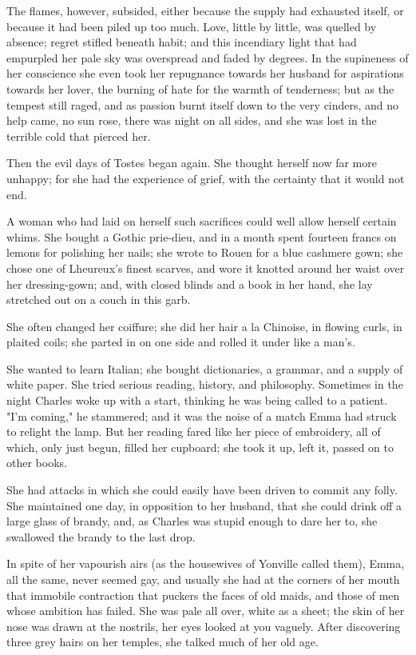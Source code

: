 \documentclass[11pt,twocolumn]{ltugboat}
\begin{document}
The flames, however, subsided, either because the supply had exhausted
itself, or because it had been piled up too much. Love, little by
little, was quelled by absence; regret stifled beneath habit; and this
incendiary light that had empurpled her pale sky was overspread and
faded by degrees. In the supineness of her conscience she even took her
repugnance towards her husband for aspirations towards her lover, the
burning of hate for the warmth of tenderness; but as the tempest still
raged, and as passion burnt itself down to the very cinders, and no help
came, no sun rose, there was night on all sides, and she was lost in the
terrible cold that pierced her.

Then the evil days of Tostes began again. She thought herself now far
more unhappy; for she had the experience of grief, with the certainty
that it would not end.

A woman who had laid on herself such sacrifices could well allow herself
certain whims. She bought a Gothic prie-dieu, and in a month spent
fourteen francs on lemons for polishing her nails; she wrote to Rouen
for a blue cashmere gown; she chose one of Lheureux's finest scarves,
and wore it knotted around her waist over her dressing-gown; and, with
closed blinds and a book in her hand, she lay stretched out on a couch
in this garb.

She often changed her coiffure; she did her hair a la Chinoise, in
flowing curls, in plaited coils; she parted in on one side and rolled it
under like a man's.

She wanted to learn Italian; she bought dictionaries, a grammar, and
a supply of white paper. She tried serious reading, history, and
philosophy. Sometimes in the night Charles woke up with a start,
thinking he was being called to a patient. "I'm coming," he stammered;
and it was the noise of a match Emma had struck to relight the lamp. But
her reading fared like her piece of embroidery, all of which, only just
begun, filled her cupboard; she took it up, left it, passed on to other
books.

She had attacks in which she could easily have been driven to commit any
folly. She maintained one day, in opposition to her husband, that she
could drink off a large glass of brandy, and, as Charles was stupid
enough to dare her to, she swallowed the brandy to the last drop.

In spite of her vapourish airs (as the housewives of Yonville called
them), Emma, all the same, never seemed gay, and usually she had at the
corners of her mouth that immobile contraction that puckers the faces of
old maids, and those of men whose ambition has failed. She was pale all
over, white as a sheet; the skin of her nose was drawn at the nostrils,
her eyes looked at you vaguely. After discovering three grey hairs on
her temples, she talked much of her old age.
\end{document}
